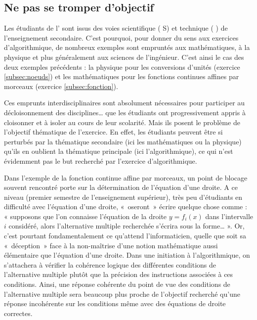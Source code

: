 \subsection{Ne pas se tromper d'objectif}\label{subsec:objectif}
Les étudiants de l'\enib{} sont issus des voies scientifique (\bac{} S)
et technique (\bac{} \sti) de l'enseignement secondaire. 
C'est pourquoi, pour donner du sens aux exercices d'algorithmique, 
de nombreux exemples sont empruntés aux mathématiques, à la physique 
et plus généralement aux sciences de l'ingénieur. 
C'est ainsi le cas des deux exemples précédents : la physique pour les
conversions d'unités (exercice \ref{subsec:noeuds}) et les mathématiques pour les
fonctions continues affines par morceaux (exercice \ref{subsec:fonction}).

Ces emprunts interdisciplinaires sont absolument nécessaires pour participer
au décloisonnement des disciplines\ldots{} que les étudiants ont progressivement 
appris à cloisonner et à isoler au cours de leur scolarité. 
Mais ils posent le problème de l'objectif thématique de l'exercice. 
En effet, les étudiants peuvent être si perturbés par la thématique 
secondaire (ici les mathématiques ou la physique) qu'ils en oublient la
thématique principale (ici l'algorithmique), ce qui n'est évidemment pas 
le but recherché par l'exercice d'algorithmique.

Dans l'exemple de la fonction continue affine par morceaux, un point de blocage
souvent rencontré porte sur la détermination de l'équation d'une droite. 
A ce niveau (premier semestre de l'enseignement supérieur), 
très peu d'étudiants en difficulté avec l'équation d'une droite,
«~oseront~» écrire quelque chose comme :
« supposons que l'on connaisse l'équation de la droite $y = f_i(x)$
dans l'intervalle $i$ considéré, alors l'alternative multiple recherchée 
s'écrira sous la forme\ldots{} ». Or, c'est pourtant fondamentalement ce qu'attend l'informaticien, quelle que soit sa «~déception~» face à la non-maîtrise d'une notion
mathématique aussi élémentaire que l'équation d'une droite.
Dans une initiation à l'algorithmique, on s'attachera à vérifier 
la cohérence logique des différentes conditions de l'alternative multiple 
plutôt que la précision des instructions associées à ces conditions. 
Ainsi, une réponse cohérente du point de vue des conditions de l'alternative
multiple sera beaucoup plus proche de l'objectif recherché qu'une réponse 
incohérente sur les conditions même avec des équations de droite correctes.

